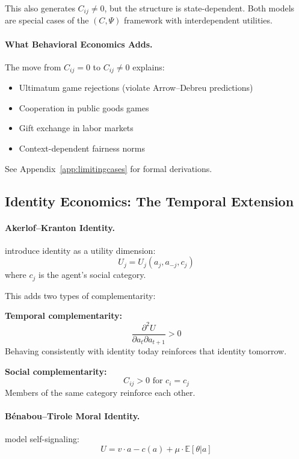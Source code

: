 This also generates $C_{ij} \neq 0$, but the structure is state-dependent.
Both models are special cases of the $(C, \Psi)$ framework with interdependent utilities.

\paragraph{What Behavioral Economics Adds.}
The move from $C_{ij} = 0$ to $C_{ij} \neq 0$ explains:
\begin{itemize}
  \item Ultimatum game rejections (violate Arrow--Debreu predictions)
  \item Cooperation in public goods games
  \item Gift exchange in labor markets
  \item Context-dependent fairness norms
\end{itemize}

See Appendix~\ref{app:limitingcases} for formal derivations.

\subsection{Identity Economics: The Temporal Extension}

\paragraph{Akerlof--Kranton Identity.}
\citet{akerlofkranton} introduce identity as a utility dimension:
\begin{equation}
  U_j = U_j(a_j, a_{-j}, c_j)
\end{equation}
where $c_j$ is the agent's social category.

This adds two types of complementarity:

\textbf{Temporal complementarity:}
\begin{equation}
  \frac{\partial^2 U}{\partial a_t \partial a_{t+1}} > 0
\end{equation}
Behaving consistently with identity today reinforces that identity tomorrow.

\textbf{Social complementarity:}
\begin{equation}
  C_{ij} > 0 \text{ for } c_i = c_j
\end{equation}
Members of the same category reinforce each other.

\paragraph{Bénabou--Tirole Moral Identity.}
\citet{benaboutirole} model self-signaling:
\begin{equation}
  U = v \cdot a - c(a) + \mu \cdot \mathbb{E}[\theta | a]
\end{equation}

